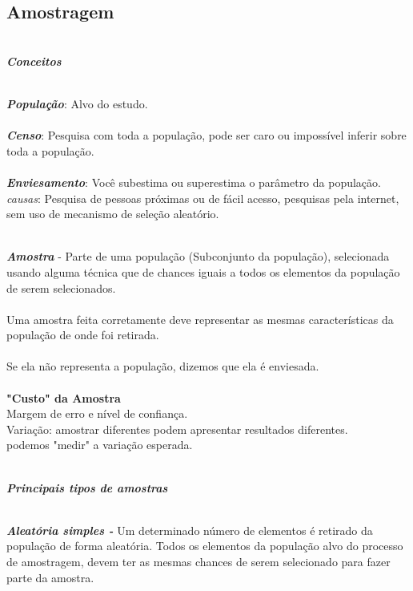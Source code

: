 	

\subsection{Amostragem} 

\textbf{\textit{\\Conceitos}} 

\textbf{\textit{\\População}}: Alvo do estudo.
\textbf{\textit{\\\\Censo}}: Pesquisa com toda a população, pode ser caro ou impossível inferir sobre toda a população.
\textbf{\textit{\\\\Enviesamento}}: Você subestima ou superestima o parâmetro da população. 
\textit{causas}: Pesquisa de pessoas próximas ou de fácil acesso, pesquisas pela internet, sem uso de mecanismo de seleção aleatório.

\textbf{\textit{\\Amostra}} - Parte de uma população (Subconjunto da população), selecionada usando alguma técnica que de chances iguais a todos os elementos da população de serem selecionados. 
\\\\Uma amostra feita corretamente deve representar as mesmas características da população de onde foi retirada.
\\\\Se ela não representa a população, dizemos que ela é enviesada.
\textbf{\\\\"Custo" da Amostra}
\\Margem de erro e nível de confiança.
\\Variação: amostrar diferentes podem apresentar resultados diferentes.
\\podemos "medir" a variação esperada.

\newpage

\textbf{\textit{\\Principais tipos de amostras}} 

\textbf{\textit{\\Aleatória simples - }}
Um determinado número de elementos é retirado da população de forma aleatória.
Todos os elementos da população alvo do processo de amostragem, devem ter as mesmas chances 
de serem selecionado para fazer parte da amostra.


